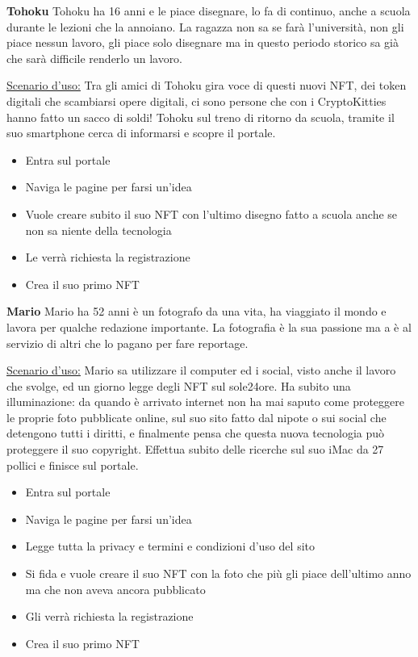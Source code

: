 \bigbreak
\noindent
\textbf{Tohoku}
\bigbreak
\noindent
Tohoku ha 16 anni e le piace disegnare, lo fa di continuo, anche a scuola durante le lezioni che la annoiano.
La ragazza non sa se farà l'università, non gli piace nessun lavoro, gli piace solo disegnare
ma in questo periodo storico sa già che sarà difficile renderlo un lavoro.

\underline{Scenario d'uso:}
Tra gli amici di Tohoku gira voce di questi nuovi NFT, dei token digitali che scambiarsi opere digitali,
ci sono persone che con i CryptoKitties hanno fatto un sacco di soldi! 
Tohoku sul treno di ritorno da scuola, tramite il suo smartphone cerca di informarsi e scopre il portale.

\begin{itemize}
	\item Entra sul portale
	\item Naviga le pagine per farsi un'idea
	\item Vuole creare subito il suo NFT con l'ultimo disegno fatto a scuola anche se non sa niente della tecnologia
	\item Le verrà richiesta la registrazione
	\item Crea il suo primo NFT
\end{itemize}

\bigbreak
\noindent
\textbf{Mario}
\bigbreak
\noindent
Mario ha 52 anni è un fotografo da una vita, ha viaggiato il mondo e lavora per qualche redazione importante.
La fotografia è la sua passione ma a è al servizio di altri che lo pagano per fare reportage.

\underline{Scenario d'uso:}
Mario sa utilizzare il computer ed i social, visto anche il lavoro che svolge, ed un giorno legge degli NFT sul sole24ore.
Ha subito una illuminazione: da quando è arrivato internet non ha mai saputo come proteggere le proprie foto pubblicate online, 
sul suo sito fatto dal nipote o sui social che detengono tutti i diritti, e finalmente pensa che questa nuova tecnologia può proteggere il suo copyright.
Effettua subito delle ricerche sul suo iMac da 27 pollici e finisce sul portale.

\begin{itemize}
	\item Entra sul portale
	\item Naviga le pagine per farsi un'idea
	\item Legge tutta la privacy e termini e condizioni d'uso del sito
	\item Si fida e vuole creare il suo NFT con la foto che più gli piace dell'ultimo anno ma che non aveva ancora pubblicato
	\item Gli verrà richiesta la registrazione
	\item Crea il suo primo NFT
\end{itemize}

